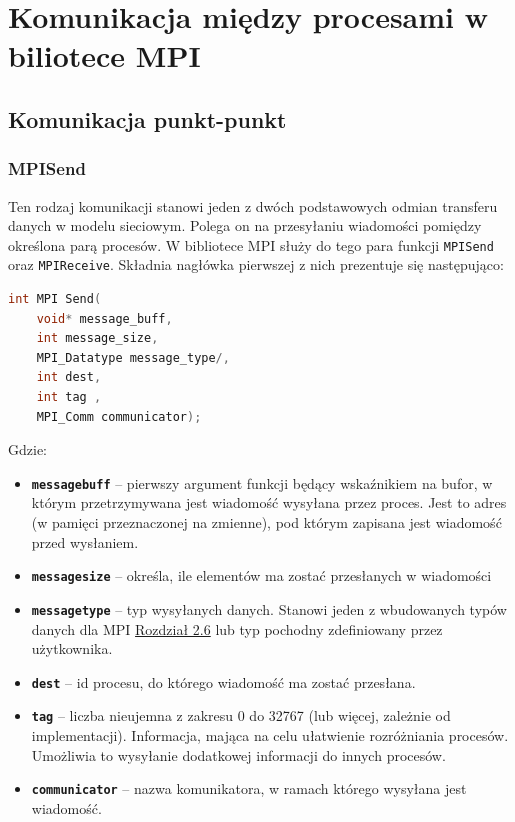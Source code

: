 \section{Komunikacja między procesami w biliotece MPI}

\subsection{Komunikacja punkt-punkt}

\subsubsection{MPI\textunderscore Send}
Ten rodzaj komunikacji stanowi jeden z dwóch podstawowych odmian transferu danych w modelu sieciowym. Polega on na przesyłaniu wiadomości pomiędzy określona parą procesów. W bibliotece MPI służy do tego para funkcji \texttt{MPI\textunderscore Send} oraz \texttt{MPI\textunderscore Receive}. Składnia nagłówka pierwszej z nich prezentuje się następująco: 
\begin{lstlisting}[language=C]
int MPI Send(
	void* message_buff,
	int message_size,
	MPI_Datatype message_type/,
	int dest,
	int tag ,
	MPI_Comm communicator);
\end{lstlisting}

Gdzie:
\begin{itemize}
	\item \texttt{\textbf{message\textunderscore buff}} -- pierwszy argument funkcji będący wskaźnikiem na bufor, w którym przetrzymywana jest wiadomość wysyłana przez proces. Jest to adres (w pamięci przeznaczonej na zmienne), pod którym zapisana jest wiadomość przed wysłaniem.
	\item \texttt{\textbf{message\textunderscore size}} -- określa, ile elementów ma zostać przesłanych w wiadomości
	\item \texttt{\textbf{message\textunderscore type}} -- typ wysyłanych danych. Stanowi jeden z wbudowanych typów danych dla MPI \hyperref[table:datatypes]{Rozdział 2.6} lub typ pochodny zdefiniowany przez użytkownika.
	\item \texttt{\textbf{dest}} -- id procesu, do którego wiadomość ma zostać przesłana.
	\item \texttt{\textbf{tag}} -- liczba nieujemna z zakresu 0 do 32767 (lub więcej, zależnie od implementacji). Informacja, mająca na celu ułatwienie rozróżniania procesów. Umożliwia to wysyłanie dodatkowej informacji do innych procesów.
	\item \texttt{\textbf{communicator}} -- nazwa komunikatora, w ramach którego wysyłana jest wiadomość.
\end{itemize}

